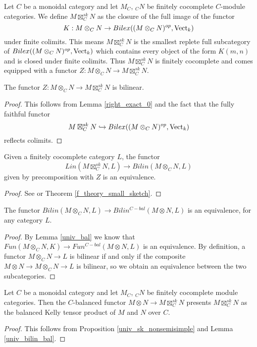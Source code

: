 \begin{definition}\label{sk_nonsemisimple} Let $C$ be a monoidal category and let $M_C$, $_{C}N$ be finitely cocomplete $C$-module categories. We define $M\boxtimes_C^{sk}N$ as the closure of the full image of the functor $$K:M\otimes_C N \to Bilex((M\otimes_C N)^{op},\operatorname{Vect}_k)$$ under finite colimits. This means $M\boxtimes_C^{sk}N$ is the smallest replete full subcategory of $Bilex((M\otimes_C N)^{op},\operatorname{Vect}_k)$ which contains every object of the form $K(m,n)$ and is closed under finite colimits. Thus $M\boxtimes_C^{sk}N$ is finitely cocomplete and comes equipped with a functor $Z:M\otimes_C N \to M\boxtimes_C^{sk}N$.\end{definition}

\begin{lemma}\label{right_exact}
The functor $Z:M\otimes_C N \to M\boxtimes_C^{sk}N$ is bilinear.
\end{lemma}
\begin{proof}
 This follows from Lemma \ref{right_exact_0} and the fact that the fully faithful functor $$M\boxtimes_C^{sk}N\hookrightarrow Bilex((M\otimes_C N)^{op},\operatorname{Vect}_k)$$ reflects colimits.\end{proof}



\begin{proposition}\label{univ_sk_nonsemisimple}
Given a finitely cocomplete category $L$, the functor $$Lin(M\boxtimes_C^{sk}N,L)\to Bilin(M\otimes_C N, L)$$ given by precomposition with $Z$ is an equivalence.\end{proposition}
\begin{proof} See \cite[Theorem 6.23]{kelly/basic-concepts-enriched} or Theorem \ref{f_theory_small_sketch}.\end{proof}

\begin{lemma}\label{univ_bilin_bal}
The functor $Bilin(M\otimes_C N,L)\to Bilin^{C-bal}(M\otimes N, L)$ is an equivalence, for any category $L$. \end{lemma}
\begin{proof}
By Lemma \ref{univ_bal} we know that $Fun(M\otimes_C N,K)\to Fun^{C-bal}(M\otimes N, L)$ is an equivalence. By definition, a functor $M\otimes_C N\to L$ is bilinear if and only if the composite $M\otimes N\to M\otimes_C N\to L$ is bilinear, so we obtain an equivalence between the two subcategories.\end{proof}

\begin{theorem}\label{main_nonsemisimple}
 Let $C$ be a monoidal category and let $M_C$, $_{C}N$ be finitely cocomplete module categories. Then the $C$-balanced functor $M\otimes N\to M\boxtimes_C^{sk}N$ presents $M\boxtimes_C^{sk}N$ as the balanced Kelly tensor product of $M$ and $N$ over $C$.\end{theorem}
 \begin{proof}

This follows from Proposition \ref{univ_sk_nonsemisimple} and Lemma \ref{univ_bilin_bal}.\end{proof}

